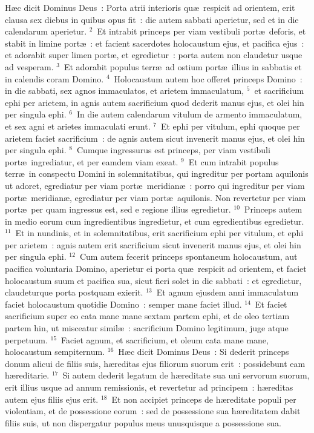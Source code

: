 \lettrine[lines=10,image=true,loversize=0.05,lraise=-0.03]{H}{}\ae c dicit Dominus Deus~: Porta atrii interioris qu\ae\ respicit ad orientem, erit clausa sex diebus in quibus opus fit~: die autem sabbati aperietur, sed et in die calendarum aperietur.
${}^{2}$~Et intrabit princeps per viam vestibuli port\ae\ deforis, et stabit in limine port\ae~: et facient sacerdotes holocaustum ejus, et pacifica ejus~: et adorabit super limen port\ae , et egredietur~: porta autem non claudetur usque ad vesperam.
${}^{3}$~Et adorabit populus terr\ae\ ad ostium port\ae\ illius in sabbatis et in calendis coram Domino.
${}^{4}$~Holocaustum autem hoc offeret princeps Domino~: in die sabbati, sex agnos immaculatos, et arietem immaculatum,
${}^{5}$~et sacrificium ephi per arietem, in agnis autem sacrificium quod dederit manus ejus, et olei hin per singula ephi.
${}^{6}$~In die autem calendarum vitulum de armento immaculatum, et sex agni et arietes immaculati erunt.
${}^{7}$~Et ephi per vitulum, ephi quoque per arietem faciet sacrificium~: de agnis autem sicut invenerit manus ejus, et olei hin per singula ephi.
${}^{8}$~Cumque ingressurus est princeps, per viam vestibuli port\ae\ ingrediatur, et per eamdem viam exeat.
${}^{9}$~Et cum intrabit populus terr\ae\ in conspectu Domini in solemnitatibus, qui ingreditur per portam aquilonis ut adoret, egrediatur per viam port\ae\ meridian\ae~: porro qui ingreditur per viam port\ae\ meridian\ae , egrediatur per viam port\ae\ aquilonis. Non revertetur per viam port\ae\ per quam ingressus est, sed e regione illius egredietur.
${}^{10}$~Princeps autem in medio eorum cum ingredientibus ingredietur, et cum egredientibus egredietur.
${}^{11}$~Et in nundinis, et in solemnitatibus, erit sacrificium ephi per vitulum, et ephi per arietem~: agnis autem erit sacrificium sicut invenerit manus ejus, et olei hin per singula ephi.
${}^{12}$~Cum autem fecerit princeps spontaneum holocaustum, aut pacifica voluntaria Domino, aperietur ei porta qu\ae\ respicit ad orientem, et faciet holocaustum suum et pacifica sua, sicut fieri solet in die sabbati~: et egredietur, claudeturque porta postquam exierit.
${}^{13}$~Et agnum ejusdem anni immaculatum faciet holocaustum quotidie Domino~: semper mane faciet illud.
${}^{14}$~Et faciet sacrificium super eo cata mane mane sextam partem ephi, et de oleo tertiam partem hin, ut misceatur simil\ae~: sacrificium Domino legitimum, juge atque perpetuum.
${}^{15}$~Faciet agnum, et sacrificium, et oleum cata mane mane, holocaustum sempiternum.
${}^{16}$~H\ae c dicit Dominus Deus~: Si dederit princeps donum alicui de filiis suis, h\ae reditas ejus filiorum suorum erit~: possidebunt eam h\ae reditarie.
${}^{17}$~Si autem dederit legatum de h\ae reditate sua uni servorum suorum, erit illius usque ad annum remissionis, et revertetur ad principem~: h\ae reditas autem ejus filiis ejus erit.
${}^{18}$~Et non accipiet princeps de h\ae reditate populi per violentiam, et de possessione eorum~: sed de possessione sua h\ae reditatem dabit filiis suis, ut non dispergatur populus meus unusquisque a possessione sua.


